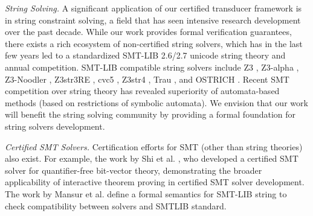 \emph{String Solving.} A significant application of our certified transducer
framework is in string constraint solving, a field that has seen intensive
research development over the past decade. While our work provides formal
verification guarantees, there exists a rich ecosystem of non-certified string
solvers, which has in the last few years led to a standardized SMT-LIB 2.6/2.7 
unicode string theory and annual competition. SMT-LIB compatible string 
solvers include Z3 \cite{Z3}, Z3-alpha \cite{z3alpha}, Z3-Noodler 
\cite{noodler,noodler-int,noodler-len, noodler-tool}, Z3str3RE \cite{z3str3re},
cvc5 \cite{cvc5}, Z3str4 \cite{z3str4}, Trau \cite{Z3-trau,trau-tool}, and 
OSTRICH \cite{ostrich,CHL+19,pacmpl/ChenFHHHKLRW22}. 
Recent SMT competition over string theory has revealed
superiority of automata-based methods (based on restrictions of symbolic
automata). 
We envision that our work will benefit the string solving community by 
providing a formal foundation for string solvers development.



\emph{Certified SMT Solvers.} Certification efforts 
for SMT (other than string theories) also exist. For example, the work by Shi et al. \cite{DBLP:conf/cav/ShiFLTWY20}, who developed a certified SMT solver for quantifier-free bit-vector theory, demonstrating the broader applicability of interactive theorem proving in certified SMT solver development. The work by Mansur et al. \cite{verified-verifying} define a formal semantics for SMT-LIB string
to check compatibility between solvers and SMTLIB standard.
